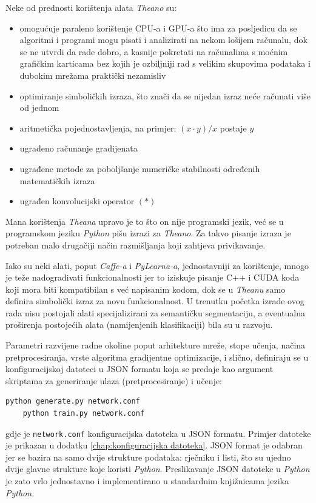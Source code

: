\documentclass[times, utf8, diplomski, numeric]{fer}
\begin{document}
Neke od prednosti korištenja alata \textit{Theano} su:
\begin{itemize}
	\item omogućuje paraleno korištenje CPU-a i GPU-a što ima za posljedicu da se algoritmi i programi mogu pisati i analizirati na nekom lošijem računalu, dok se ne utvrdi da rade dobro, a kasnije pokretati na računalima s moćnim grafičkim karticama bez kojih je ozbiljniji rad s velikim skupovima podataka i dubokim mrežama praktički nezamisliv
    \item optimiranje simboličkih izraza, što znači da se nijedan izraz neće računati više od jednom
    \item aritmetička pojednostavljenja, na primjer: $(x \cdot y)/x$ postaje $y$
    \item ugrađeno računanje gradijenata
    \item ugrađene metode za poboljšanje numeričke stabilnosti određenih matematičkih izraza
    \item ugrađen konvolucijski operator $\left( * \right)$
\end{itemize}
Mana korištenja \textit{Theana} upravo je to što on nije programski jezik, već se u programskom jeziku \textit{Python} pišu izrazi za \textit{Theano}. Za takvo pisanje izraza je potreban malo drugačiji način razmišljanja koji zahtjeva privikavanje.

Iako su neki alati, poput \textit{Caffe-a} i \textit{PyLearna-a}, jednostavniji za korištenje, mnogo je teže nadograđivati funkcionalnosti jer to iziskuje pisanje C++ i CUDA koda koji mora biti kompatibilan s već napisanim kodom, dok se u \textit{Theanu} samo definira simbolički izraz za novu funkcionalnost. U trenutku početka izrade ovog rada nisu postojali alati specijalizirani za semantičku segmentaciju, a eventualna proširenja postojećih alata (namijenjenih klasifikaciji) bila su u razvoju.

Parametri razvijene radne okoline poput arhitekture mreže, stope učenja, načina pretprocesiranja, vrste algoritma gradijentne optimizacije, i slično, definiraju se u konfiguracijskoj datoteci u JSON formatu koja se predaje kao argument skriptama za generiranje ulaza (pretprocesiranje) i učenje:
\begin{lstlisting}[language=bash]
    python generate.py network.conf
    python train.py network.conf
\end{lstlisting}
gdje je \texttt{network.conf} konfiguracijska datoteka u JSON formatu. Primjer datoteke je prikazan u dodatku \ref{chap:konfiguracijska datoteka}. JSON format je odabran jer se bazira na samo dvije strukture podataka: rječniku i listi, što su ujedno dvije glavne strukture koje koristi \textit{Python}. Preslikavanje JSON datoteke u \textit{Python} je zato vrlo jednostavno i implementirano u standardnim knjižnicama jezika \textit{Python}.
\end{document}
